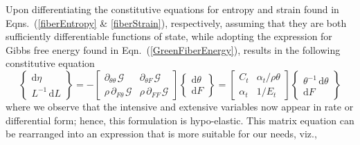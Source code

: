Upon differentiating the constitutive equations for entropy and strain found in Eqns.\ (\ref{fiberEntropy} \& \ref{fiberStrain}), respectively, assuming that they are both sufficiently differentiable functions of state, while adopting the expression for Gibbs free energy found in Eqn.~(\ref{GreenFiberEnergy}), results in the following constitutive equation
\begin{displaymath}
\left\{ \begin{matrix}
\mathrm{d} \eta \\ L^{-1} \, \mathrm{d} L 
\end{matrix} \right\} = -\begin{bmatrix}
\partial_{\theta\theta\,} \mathcal{G} & \partial_{\theta F\,} \mathcal{G} \\
\rho \, \partial_{F\theta\,} \mathcal{G} & \rho \, \partial_{FF\,} \mathcal{G}
\end{bmatrix} 
\left\{ \begin{matrix}
\mathrm{d} \theta \\ \mathrm{d} F
\end{matrix} \right\}
= \begin{bmatrix}
C_t & \alpha_t / \rho \theta \\
\alpha_t & 1 / E_t
\end{bmatrix}
\left\{ \begin{matrix}
\theta^{-1} \, \mathrm{d} \theta \\ \mathrm{d} F
\end{matrix} \right\}
\end{displaymath}
where we observe that the intensive and extensive variables now appear in rate or differential form; hence, this formulation is hypo-elastic. \cite{Truesdell55}  This matrix equation can be rearranged into an expression that is more suitable for our needs, viz.,

